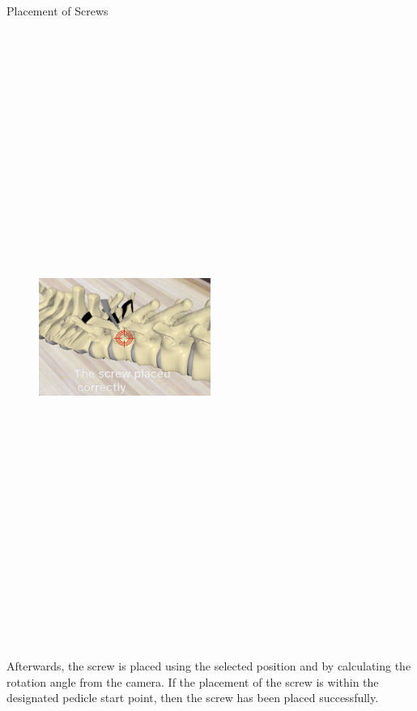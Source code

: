 \documentclass[final]{beamer}
\newlength{\onecolwid}
\begin{document}
\begin{frame}[t]
\begin{columns}[t]
\begin{column}{\onecolwid}
\begin{block}{\LARGE Placement of Screws}
\begin{figure}
\centering
\includegraphics[width=0.5\textwidth,height=20cm]{screw.png}

\end{figure}
\large
Afterwards, the screw is placed using the selected position and by calculating the rotation angle from the camera. If the placement of the screw is within the designated pedicle start point, then the screw has been placed successfully.

\end{block}


\end{column} %

\end{columns} %

\end{frame} %
\end{document}
